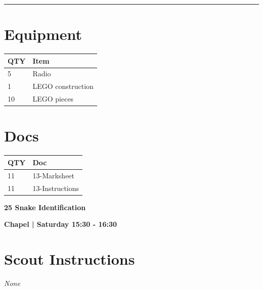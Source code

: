 \documentclass[10pt]{article}
\newcommand{\newtitle}[1]{\begin{center}{\Huge\bfseries #1 }\\ \vspace{5mm}\end{center}}
\newcommand{\newsubtitle}[1]{\begin{center}{\color{grey}\Large\bfseries #1 }\\ \vspace{5mm}\end{center}}
\begin{document}
			\vspace{0.5cm}
	\hrule
	\vspace{0.5cm}

	\begin{multicols}{2}

		\section*{\faWrench \: Equipment}

		
	\begin{center}
			\begin{tabular}{p{2cm}p{4cm}}


				\textbf{QTY} & \textbf{Item} \\\toprule
												5&Radio\\\midrule
												1&LEGO construction\\\midrule
												10&LEGO pieces\\\midrule
								\end{tabular}

			\end{center}

		
		\vfill\null
		\columnbreak

			\section*{\faFile \: Docs}
		 	\begin{center}
			\begin{tabular}{p{2cm}p{4cm}}

			\textbf{QTY} & \textbf{Doc} \\\toprule
										11&13-Marksheet\\\midrule
										11&13-Instructions\\\midrule
							\end{tabular}
			\end{center}
	

		\vfill\null

		\end{multicols}



	\vspace{1cm}


	\clearpage
		\newtitle{25 Snake Identification }
	\newsubtitle{Chapel | Saturday 15:30 - 16:30}
		\setcounter{section}{24}
	\section*{Scout Instructions}
		\textit{None}
	
\end{document}
